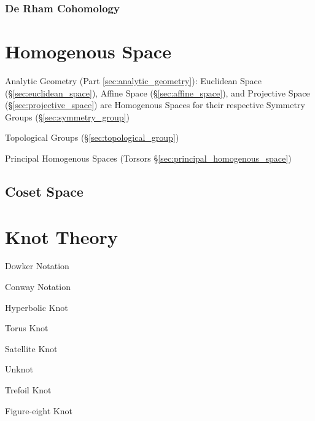 \subsubsection{De Rham Cohomology}\label{sec:derham_cohomology}



\section{Homogenous Space}\label{sec:homogenous_space}

Analytic Geometry (Part \ref{sec:analytic_geometry}): Euclidean Space
(\S\ref{sec:euclidean_space}), Affine Space (\S\ref{sec:affine_space}), and
Projective Space (\S\ref{sec:projective_space}) are Homogenous Spaces for their
respective Symmetry Groups (\S\ref{sec:symmetry_group})

Topological Groups (\S\ref{sec:topological_group})

Principal Homogenous Spaces (Torsors \S\ref{sec:principal_homogenous_space})



\subsection{Coset Space}\label{sec:coset_space}



\section{Knot Theory} \label{sec:knot_theory}

Dowker Notation

Conway Notation



Hyperbolic Knot

Torus Knot

Satellite Knot



Unknot

Trefoil Knot

Figure-eight Knot

